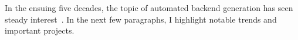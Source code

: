 







In the ensuing five decades,
  the topic of automated backend
  generation
  has seen steady interest~\cite{
  buchwald2018synthesizing,
  dias2010automatically,
  brandner2007compiler,
  daly2022synthesizing,
  leupers1997retargetable,
  brandner2013automatic}.
In the next few paragraphs,
  I highlight notable trends
  and important projects.
  
